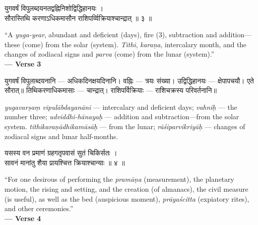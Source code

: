 \documentclass[11pt,a4paper]{article}
\newcommand{\dev}[1]{{\devanagarifont #1}}
\newenvironment{bilingualverse}{%
  \begin{paracol}{2}
  \fontsize{10.5}{13}\selectfont
}{%
  \end{paracol}
  \vspace{0.3cm}
}
\newenvironment{paracol}[1]{\begingroup}{\endgroup}
\newenvironment{leftcolumn*}{\begingroup}{\endgroup}
\newenvironment{rightcolumn}{\begingroup}{\endgroup}
\begin{document}
\vspace{0.4cm}

\begin{bilingualverse}
\begin{leftcolumn*}
\dev{युगवर्षं विपुलब्दयनतद्वह्निनिशोद्विद्धिहानयः ।}\\
\dev{सौरास्तिथि करणाऽधिकमासौन राशिपर्व्विक्रियाश्चान्द्रात् ॥ ३ ॥}
\end{leftcolumn*}
\begin{rightcolumn}
``A \textit{yuga-year}, abundant and deficient (days), fire (3), subtraction and addition---these (come) from the solar (system). \textit{Tithi}, \textit{karaṇa}, intercalary month, and the changes of zodiacal signs and \textit{parva} (come) from the lunar (system).''\\[0.3cm]
\hfill\textbf{— Verse 3}
\end{rightcolumn}
\end{bilingualverse}

\begin{paracol}{2}
\begin{leftcolumn*}
\dev{युगवर्षं विपुलाब्दयनानि} — अधिकदिनक्षयदिनानि। \dev{वह्निः} — त्रयः संख्या। \dev{उद्विद्धिहानयः} — क्षेपापचयौ। एते सौरात्॥ \dev{तिथिकरणाधिकमासाः} — चान्द्रात्। \dev{राशिपर्विक्रियाः} — राशिचक्रस्य परिवर्तनानि॥
\end{leftcolumn*}
\begin{rightcolumn}
\textit{yugavarṣaṃ vipulābdayanāni} — intercalary and deficient days; \textit{vahniḥ} — the number three; \textit{udviddhi-hānayaḥ} — addition and subtraction---from the solar system. \textit{tithikaraṇādhikamāsāḥ} --- from the lunar; \textit{rāśiparvikriyāḥ} --- changes of zodiacal signs and lunar half-months.
\end{rightcolumn}
\end{paracol}

\vspace{0.4cm}

\begin{bilingualverse}
\begin{leftcolumn*}
\dev{यसस्य वन प्रमाणं ग्रहगतृपवासं सुतं चिकिर्सतः ।}\\
\dev{सावनं मानांतु शैया प्रायश्चित्त क्रियाश्चान्याः ॥ ४ ॥}
\end{leftcolumn*}
\begin{rightcolumn}
``For one desirous of performing the \textit{pramāṇa} (measurement), the planetary motion, the rising and setting, and the creation (of almanacs), the civil measure (is useful), as well as the bed (auspicious moment), \textit{prāyaścitta} (expiatory rites), and other ceremonies.''\\[0.3cm]
\hfill\textbf{— Verse 4}
\end{rightcolumn}
\end{bilingualverse}
\end{document}
